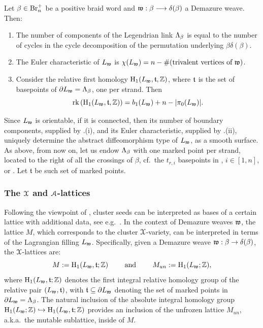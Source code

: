 \begin{lemma}\label{lem:smooth_topology_weave_fillings}
Let $\beta\in\brn$ be a positive braid word and $\w:\beta\lr\delta(\beta)$ a Demazure weave. Then:\\

\begin{enumerate}[label=$(\roman*)$]
    \item The number of components of the Legendrian link $\La_\beta$ is equal to the number of cycles in the cycle decomposition of the permutation underlying $\beta\delta(\beta)$.\\

    \item The Euler characteristic of $L_\w$ is $\chi(L_\w)=n-\#(\mbox{trivalent vertices of }\w)$.\\

    \item Consider the relative first homology $\operatorname{H}_1(L_\w,\tt,\Z)$, where $\tt$ is the set of basepoints of $\dd L_\w=\La_\beta$, one per strand. Then
    $$\operatorname{rk}\left(\operatorname{H}_1(L_\w,\tt,\Z)\right)=b_1(L_\w)+n-|\pi_0(L_\w)|.$$
    \sbs
\end{enumerate}
\end{lemma}

\noindent Since $L_\w$ is orientable, if it is connected, then its number of boundary components, supplied by .(i), and its Euler characteristic, supplied by .(ii), uniquely determine the abstract diffeomorphism type of $L_\w$, as a smooth surface. As above, from now on, let us endow $\La_\beta$ with one marked point per strand, located to the right of all the crossings of $\beta$, cf.~the $t_{r,i}$ basepoints in \cite[Figure 23]{CasalsNg22}, $i\in[1,n]$, or \cite[Figure 2 (left)]{casals2026vanishinghigherlegendrianhomology}. Let $\mathfrak{t}$ be such set of marked points.

\subsubsection{The $\SX$ and $\SA$-lattices}\label{sssec:X_lattice} Following the viewpoint of \cite{FG2006,FG09}, cluster seeds can be interpreted as bases of a certain lattice with additional data, see e.g.~\cite[Appendix A]{GHKK18}. In the context of Demazure weaves $\w$, the lattice $M$, which corresponds to the cluster $\SX$-variety, can be interpreted in terms of the Lagrangian filling $L_\w$. Specifically, given a Demazure weave $\w:\beta\to\delta(\beta)$, the $\SX$-lattices are:
$$M:=\hH_1(L_\w,\tt;\Z)\qquad\mbox{ and }\qquad M_{un}:=\hH_1(L_\w;\Z),$$
\noindent where $\hH_1(L_\w,\tt;\Z)$ denotes the first integral relative homology group of the relative pair $(L_\w,\tt)$, with $\tt\sse\dd L_\w$ denoting the set of marked points in $\dd L_\w=\La_\b$. The natural inclusion of the absolute integral homology group $\hH_1(L_\w;\Z)\hookrightarrow \hH_1(L_\w,\tt;\Z)$ provides an inclusion of the unfrozen lattice $M_{un}$, a.k.a.~the mutable sublattice, inside of $M$.

